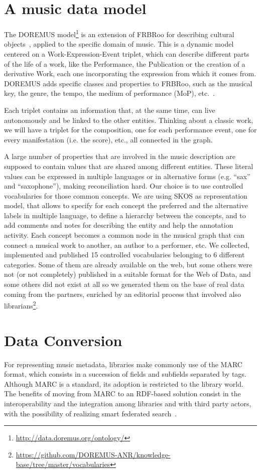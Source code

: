 \section{A music data model}\label{sec:model}
The DOREMUS model\footnote{\url{http://data.doremus.org/ontology/}} is an extension of FRBRoo for describing cultural objects~\cite{doerr2008frbroo}, applied to the specific domain of music. This is a dynamic model centered on a Work-Expression-Event triplet, which can describe different parts of the life of a work, like the Performance, the Publication or the creation of a derivative Work, each one incorporating the expression from which it comes from. DOREMUS adds specific classes and properties to FRBRoo, such as the musical key, the genre, the tempo, the medium of performance (MoP), etc.~\cite{choffe2016doremus}.

Each triplet contains an information that, at the same time, can live autonomously and be linked to the other entities. Thinking about a classic work, we will have a triplet for the composition, one for each performance event, one for every manifestation (i.e. the score), etc., all connected in the graph.

A large number of properties that are involved in the music description are supposed to contain values that are shared among different entities. These literal values can be expressed in multiple languages or in alternative forms (e.g. ``sax'' and ``saxophone''), making reconciliation hard. Our choice is to use controlled vocabularies for those common concepts. We are using SKOS as representation model, that allows to specify for each concept the preferred and the alternative labels in multiple language, to define a hierarchy between the concepts, and to add comments and notes for describing the entity and help the annotation activity. Each concept becomes a common node in the musical graph that can connect a musical work to another, an author to a performer, etc. We collected, implemented and published 15 controlled vocabularies belonging to 6 different categories. Some of them are already available on the web, but some others were not (or not completely) published in a suitable format for the Web of Data, and some others did not exist at all so we generated them on the base of real data coming from the partners, enriched by an editorial process that involved also librarians\footnote{\url{https://github.com/DOREMUS-ANR/knowledge-base/tree/master/vocabularies}}.

\section{Data Conversion}\label{sec:convert}
For representing music metadata, libraries make commonly use of the MARC format, which consists in a succession of fields and subfields separated by tags. Although MARC is a standard, its adoption is restricted to the library world. The benefits of moving from MARC to an RDF-based solution consist in the interoperability and the integration among libraries and with third party actors, with the possibility of realizing smart federated search~\cite{byrne2010strongest, alemu2012linked}.

